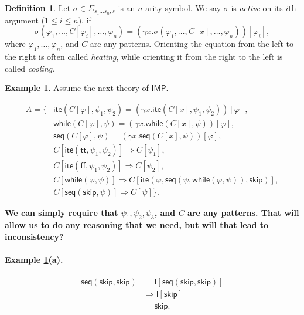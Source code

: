 \documentclass[UTF8]{article}
\newcommand{\comment}[1]
    {\par {\bfseries \color{blue} #1 \par}} %
\newcounter{thmcounter}
\theoremstyle{plain}
\theoremstyle{definition}
\newtheorem{definition}[thmcounter]{Definition}
\newtheorem{example}[thmcounter]{Example}
\theoremstyle{remark}
\newcommand{\IMP}{\mathsf{IMP}}
\newcommand{\impite}{\mathsf{ite}}
\newcommand{\impwhile}{\mathsf{while}}
\newcommand{\imptt}{\mathsf{tt}}
\newcommand{\impff}{\mathsf{ff}}
\newcommand{\impskip}{\mathsf{skip}}
\newcommand{\impseq}{\mathsf{seq}}
\begin{document}
\begin{definition}
	Let $\sigma \in \Sigma_{s_1\dots s_n, s}$ is an $n$-arity symbol. We say $\sigma$ is \emph{active} on its $i$th argument ($1 \le i \le n$), if
	$$\sigma(\varphi_1,\dots, C[\varphi_i], \dots, \varphi_n)
	= (\gamma x . \sigma(\varphi_1,\dots,C[x], \dots, \varphi_n))[\varphi_i],$$
	where $\varphi_1,\dots,\varphi_n$, and $C$ are any patterns. Orienting the equation from the left to the right is often called \emph{heating}, while orienting it from the right to the left is called \emph{cooling}.
\end{definition}

\begin{example} Assume the next theory of $\IMP$.
\label{example:IMP}

\begin{align*}
  A = \{&\impite(C[\varphi], \psi_1, \psi_2) = (\gamma x . \impite(C[x], \psi_1, \psi_2))[\varphi], \\
        &\impwhile(C[\varphi], \psi) = (\gamma x . \impwhile(C[x], \psi))[\varphi], \\
        &\impseq(C[\varphi], \psi) = (\gamma x . \impseq(C[x], \psi))[\varphi], \\
        &C[\impite(\imptt, \psi_1, \psi_2)] \Rightarrow C[\psi_1], \\
        &C[\impite(\impff, \psi_1, \psi_2)] \Rightarrow C[\psi_2], \\
        &C[\impwhile(\varphi, \psi)] \Rightarrow C[\impite(\varphi, \impseq(\psi, \impwhile(\varphi, \psi)), \impskip)], \\
        &C[\impseq(\impskip,\psi)] \Rightarrow C[\psi] \}.
\end{align*}

\comment{We can simply require that $\psi_1, \psi_2, \psi_3$, and $C$ are any patterns. That will allow us to do any reasoning that we need, but will that lead to inconsistency?}

\paragraph{Example \ref{example:IMP}(a).} 
	\begin{align*}
	\impseq(\impskip,\impskip)
	&= \mathsf{I}[\impseq(\impskip,\impskip)] \\
	&\Rightarrow \mathsf{I}[\impskip] \\
	&= \impskip.
	\end{align*}
	

\end{example}
\end{document}
